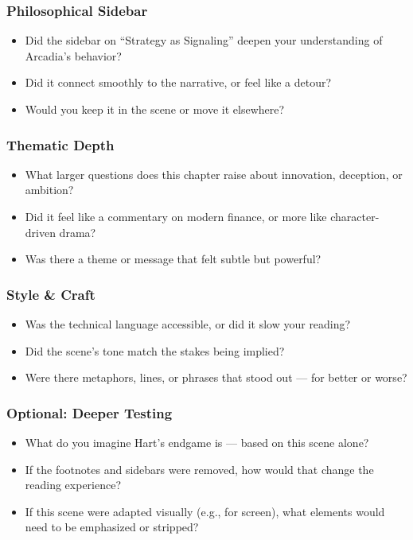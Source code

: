 \subsubsection{Philosophical Sidebar}

\begin{itemize}
  \item Did the sidebar on ``Strategy as Signaling'' deepen your understanding of Arcadia’s behavior?
  \item Did it connect smoothly to the narrative, or feel like a detour?
  \item Would you keep it in the scene or move it elsewhere?
\end{itemize}

\subsubsection{Thematic Depth}

\begin{itemize}
  \item What larger questions does this chapter raise about innovation, deception, or ambition?
  \item Did it feel like a commentary on modern finance, or more like character-driven drama?
  \item Was there a theme or message that felt subtle but powerful?
\end{itemize}

\subsubsection{Style \& Craft}

\begin{itemize}
  \item Was the technical language accessible, or did it slow your reading?
  \item Did the scene’s tone match the stakes being implied?
  \item Were there metaphors, lines, or phrases that stood out — for better or worse?
\end{itemize}

\subsubsection{Optional: Deeper Testing}

\begin{itemize}
  \item What do you imagine Hart’s endgame is — based on this scene alone?
  \item If the footnotes and sidebars were removed, how would that change the reading experience?
  \item If this scene were adapted visually (e.g., for screen), what elements would need to be emphasized or stripped?
\end{itemize}






